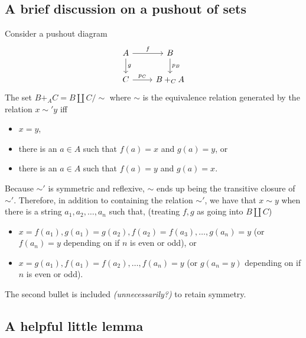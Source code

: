 \documentclass[12pt]{article}
\renewcommand{\(}{\left(}
\renewcommand{\)}{\right)}
\renewcommand{\{}{\left\lbrace}
\renewcommand{\}}{\right\rbrace}
\theoremstyle{remark}
\theoremstyle{definition}
\begin{document}
\subsection*{A brief discussion on a pushout of sets}

Consider a pushout diagram
\[
	\begin{tikzcd}
		{A} 
			\arrow{d}{g}
			\arrow{r}{f} &
		{B} 
			\arrow{d}{p_B} \\
		{C} 
			\arrow{r}{p_C} &
		{B+_CA} 
	\end{tikzcd}
\]
The set $B+_AC = B \coprod C/\sim$ where $\sim$ is the equivalence relation generated by the relation $x \sim' y$ iff 
\begin{itemize}
	\item $x=y$,
	\item there is an $a \in A$ such that $f(a)=x$ and $g(a)=y$, or
	\item there is an $a \in A$ such that $f(a)=y$ and $g(a)=x$. 
\end{itemize}
Because $\sim'$ is symmetric and reflexive, $\sim$ ends up being the transitive closure of $\sim'$. Therefore, in addition to containing the relation $\sim'$, we have that $x \sim y$ when there is a string $a_1,a_2, \dotsc, a_n$ such that, (treating $f,g$ as going into $B\coprod C$) 
\begin{itemize}
	\item $x=f(a_1), g(a_1)=g(a_2), f(a_2)=f(a_3), \dotsc, g(a_{n})=y$ (or $f(a_{n})=y$ depending on if $n$ is even or odd), or
	\item $x=g(a_1), f(a_1)=f(a_2), \dotsc, f(a_{n})=y$ (or $g(a_{n}=y)$ depending on if $n$ is even or odd). 	
\end{itemize}
The second bullet is included \textit{(unnecessarily?)} to retain symmetry.  

\subsection*{A helpful little lemma}
\end{document}
